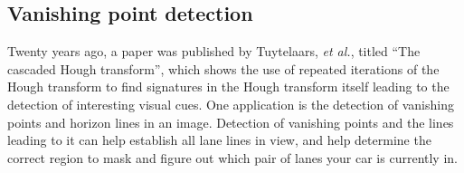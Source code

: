 \documentclass{article}
\begin{document}
\subsection{Vanishing point detection}

Twenty years ago, a paper was published by Tuytelaars, \textit{et al.}, titled ``The cascaded Hough transform'', which shows the use of repeated iterations of the Hough transform to find signatures in the Hough transform itself leading to the detection of interesting visual cues. One application is the detection of vanishing points and horizon lines in an image. Detection of vanishing points and the lines leading to it can help establish all lane lines in view, and help determine the correct region to mask and figure out which pair of lanes your car is currently in.
\end{document}
